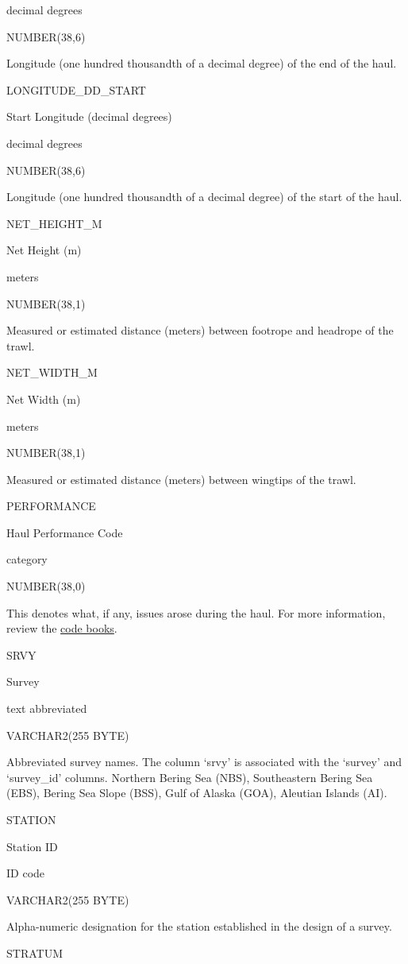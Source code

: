 \documentclass[
  letterpaper,
  oneside,
  open=any]{scrbook}
\begin{document}
decimal degrees

NUMBER(38,6)

Longitude (one hundred thousandth of a decimal degree) of the end of the
haul.

LONGITUDE\_DD\_START

Start Longitude (decimal degrees)

decimal degrees

NUMBER(38,6)

Longitude (one hundred thousandth of a decimal degree) of the start of
the haul.

NET\_HEIGHT\_M

Net Height (m)

meters

NUMBER(38,1)

Measured or estimated distance (meters) between footrope and headrope of
the trawl.

NET\_WIDTH\_M

Net Width (m)

meters

NUMBER(38,1)

Measured or estimated distance (meters) between wingtips of the trawl.

PERFORMANCE

Haul Performance Code

category

NUMBER(38,0)

This denotes what, if any, issues arose during the haul. For more
information, review the
\href{https://www.fisheries.noaa.gov/resource/document/groundfish-survey-species-code-manual-and-data-codes-manual}{code
books}.

SRVY

Survey

text abbreviated

VARCHAR2(255 BYTE)

Abbreviated survey names. The column `srvy' is associated with the
`survey' and `survey\_id' columns. Northern Bering Sea (NBS),
Southeastern Bering Sea (EBS), Bering Sea Slope (BSS), Gulf of Alaska
(GOA), Aleutian Islands (AI).

STATION

Station ID

ID code

VARCHAR2(255 BYTE)

Alpha-numeric designation for the station established in the design of a
survey.

STRATUM
\end{document}
